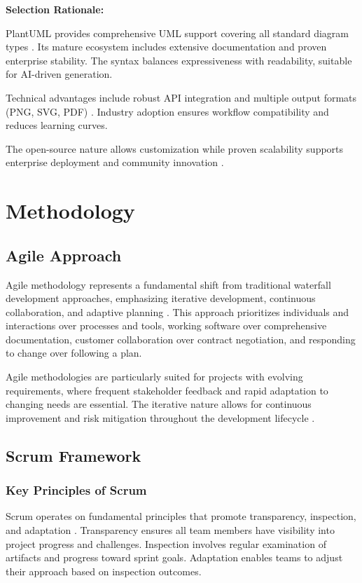 \textbf{Selection Rationale:}

PlantUML provides comprehensive UML support covering all standard diagram types \cite{plantuml_documentation}. Its mature ecosystem includes extensive documentation and proven enterprise stability. The syntax balances expressiveness with readability, suitable for AI-driven generation.

Technical advantages include robust API integration and multiple output formats (PNG, SVG, PDF) \cite{plantuml_formats}. Industry adoption ensures workflow compatibility and reduces learning curves.

The open-source nature allows customization while proven scalability supports enterprise deployment and community innovation \cite{plantuml_enterprise}.

\section{Methodology}

\subsection{Agile Approach}

Agile methodology represents a fundamental shift from traditional waterfall development approaches, emphasizing iterative development, continuous collaboration, and adaptive planning \cite{agile_manifesto}. This approach prioritizes individuals and interactions over processes and tools, working software over comprehensive documentation, customer collaboration over contract negotiation, and responding to change over following a plan.

Agile methodologies are particularly suited for projects with evolving requirements, where frequent stakeholder feedback and rapid adaptation to changing needs are essential. The iterative nature allows for continuous improvement and risk mitigation throughout the development lifecycle \cite{agile_benefits}.


\subsection{Scrum Framework}

\subsubsection{Key Principles of Scrum}

Scrum operates on fundamental principles that promote transparency, inspection, and adaptation \cite{scrum_guide}. Transparency ensures all team members have visibility into project progress and challenges. Inspection involves regular examination of artifacts and progress toward sprint goals. Adaptation enables teams to adjust their approach based on inspection outcomes.

